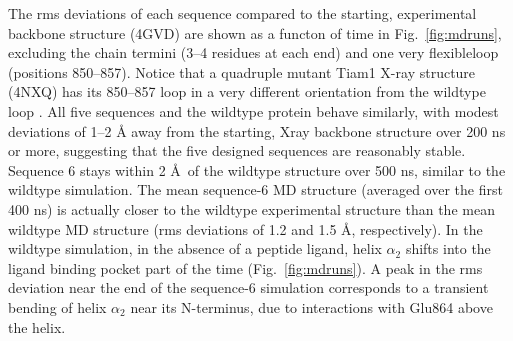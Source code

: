 \documentclass[12pt]{article}
\begin{document}
The rms deviations of each sequence compared to the starting, experimental backbone structure (4GVD) are shown as a functon of time
in Fig.\ \ref{fig:mdruns}, excluding the chain termini (3--4 residues at each end) and one very flexibleloop (positions 850--857).
Notice that a quadruple mutant Tiam1 X-ray structure (4NXQ) has its 850--857 loop in a very different orientation from the wildtype
loop \cite{Liu16}. All five sequences and the wildtype protein behave similarly, with modest deviations of 1--2 {\AA} away from the
starting, Xray backbone structure over 200 ns or more, suggesting that the five designed sequences are reasonably stable. Sequence 6
stays within 2 \AA\ of the wildtype structure over 500 ns, similar to the wildtype simulation. The mean sequence-6 MD structure (averaged
over the first 400 ns) is actually closer to the wildtype experimental structure than the mean wildtype MD structure (rms deviations
of 1.2 and 1.5 \AA, respectively). In the wildtype simulation, in the absence of a peptide ligand, helix $\alpha_2$ shifts into the
ligand binding pocket part of the time (Fig.\ \ref{fig:mdruns}). A peak in the rms deviation near the end of the sequence-6 simulation
corresponds to a transient bending of helix $\alpha_2$ near its N-terminus, due to interactions with Glu864 above the helix.
\end{document}
